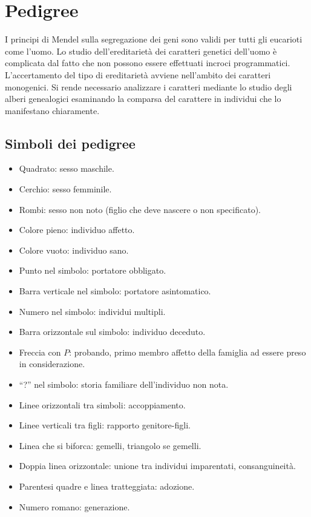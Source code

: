 \chapter{Pedigree}
I principi di Mendel sulla segregazione dei geni sono validi per tutti gli eucarioti come l'uomo. Lo studio dell'ereditariet\`a dei caratteri genetici dell'uomo \`e complicata dal
fatto che non possono essere effettuati incroci programmatici. L'accertamento del tipo di ereditariet\`a avviene nell'ambito dei caratteri monogenici. Si rende necessario analizzare
i caratteri mediante lo studio degli alberi genealogici esaminando la comparsa del carattere in individui che lo manifestano chiaramente. 

\section{Simboli dei pedigree}
\begin{multicols}{2}
	\begin{itemize}
		\item Quadrato: sesso maschile.
		\item Cerchio: sesso femminile.
		\item Rombi: sesso non noto (figlio che deve nascere o non specificato).
		\item Colore pieno: individuo affetto.
		\item Colore vuoto: individuo sano.
		\item Punto nel simbolo: portatore obbligato.
		\item Barra verticale nel simbolo: portatore asintomatico.
		\item Numero nel simbolo: individui multipli.
		\item Barra orizzontale sul simbolo: individuo deceduto.
		\item Freccia con $P$: probando, primo membro affetto della famiglia ad essere preso in considerazione.
		\item ``?'' nel simbolo: storia familiare dell'individuo non nota. 
		\item Linee orizzontali tra simboli: accoppiamento.
		\item Linee verticali tra figli: rapporto genitore-figli.
		\item Linea che si biforca: gemelli, triangolo se gemelli.
		\item Doppia linea orizzontale: unione tra individui imparentati, consanguineit\`a.
		\item Parentesi quadre e linea tratteggiata: adozione.
		\item Numero romano: generazione. 
	\end{itemize}
\end{multicols}

